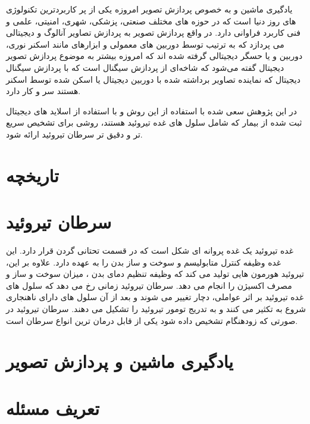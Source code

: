 
یادگیری ماشین و به خصوص پردازش تصویر امروزه یکی از پر کاربردترین تکنولوژی های روز دنیا است که در حوزه های مختلف صنعتی، پزشکی، شهری، امنیتی، علمی و فنی کاربرد فراوانی دارد.
در واقع پردازش تصویر به پردازش تصاویر آنالوگ و دیجیتالی می پردازد که به ترتیب توسط دوربین های معمولی و ابزارهای مانند اسکنر نوری، دوربین و یا حسگر دیجیتالی گرفته شده اند
که امروزه بیشتر به موضوع پردازش تصویر دیجیتال گفته می‌شود که شاخه‌ای از پردازش سیگنال است که با پردازش سیگنال دیجیتال که نماینده تصاویر برداشته شده با دوربین دیجیتال یا اسکن شده توسط اسکنر هستند سر و کار دارد.

در این پژوهش سعی شده با استفاده از این روش و با استفاده از اسلاید های دیجیتال ثبت شده از بیمار که شامل سلول های غده تیروئید هستند، روشی برای تشخیص سریع تر و دقیق تر سرطان تیروئید ارائه شود.

\section{تاریخچه}\label{sec:تاریخچه}

\section{سرطان تیروئید}\label{sec:سرطان-تیروئید}
غده تیروئید یک غده پروانه ای شکل است که در قسمت تحتانی گردن قرار دارد.
این غده وظیفه کنترل متابولیسم و سوخت و ساز بدن را به عهده دارد.
علاوه بر این، تیروئید هورمون هایی تولید می کند که وظیفه تنظیم دمای بدن ، میزان سوخت و ساز و مصرف اکسیژن را انجام می دهد.
سرطان تیروئید زمانی رخ می دهد که سلول های غده تیروئید بر اثر عواملی،  دچار تغییر می شوند و بعد از آن سلول های دارای ناهنجاری شروع به تکثیر می کنند و به تدریج تومور تیروئید را تشکیل می دهند.
سرطان تیروئید در صورتی که زودهنگام تشخیص داده شود یکی از قابل درمان ترین انواع سرطان است.







\section{یادگیری ماشین و پردازش تصویر}\label{sec:یادگیری-ماشین-و-پردازش-تصویر}

\section{تعریف مسئله}\label{sec:تعریف-مسئله2}\label{sec:تعریف-مسئله}

